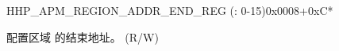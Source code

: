 \begin{register}{H}{HP\_APM\_REGION\_ADDR\_END\_REG (: 0-15)}{0x0008+0xC*}\label{regdesc:HPAPMREGION0ADDRENDREG}
%
\regnewline%
\begin{regdesc}\begin{reglist}
\label{fielddesc:HPAPMREGION0ADDREND}\item [HP\_APM\_REGION\regindex{n}\_ADDR\_END] 配置区域  的结束地址。 (R/W)
\end{reglist}\end{regdesc}
\end{register}


































































